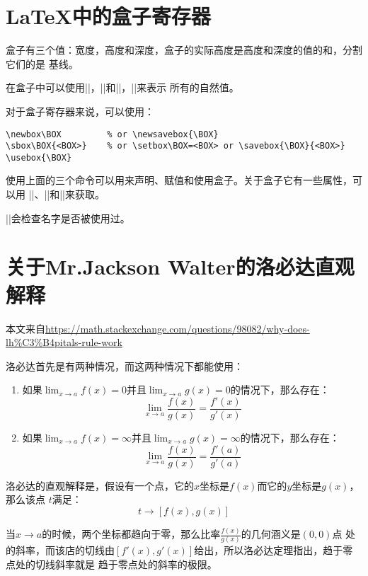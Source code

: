 
\section{\LaTeX{}中的盒子寄存器}

盒子有三个值：宽度，高度和深度，盒子的实际高度是高度和深度的值的和，分割它们的是
基线。

在盒子中可以使用\vb|\width|，\vb|\height|和\vb|\depth|，\vb|\totalheight|来表示
所有的自然值。

对于盒子寄存器来说，可以使用：
\begin{lstlisting}
\newbox\BOX         % or \newsavebox{\BOX}
\sbox\BOX{<BOX>}    % or \setbox\BOX=<BOX> or \savebox{\BOX}{<BOX>}
\usebox{\BOX}
\end{lstlisting}

使用上面的三个命令可以用来声明、赋值和使用盒子。关于盒子它有一些属性，可以用%
\vb|\ht|、\vb|\wd|和\vb|\dp|来获取。

\vb|\newsavebox|会检查名字是否被使用过。



\section{关于Mr.Jackson Walter的洛必达直观解释}

本文来自\url{https://math.stackexchange.com/questions/98082/why-does-lh\%C3\%B4pitals-rule-work}

洛必达首先是有两种情况，而这两种情况下都能使用：

\begin{enumerate}
    \item 如果$\lim_{x\to a}f(x)=0$并且$\lim_{x\to a}g(x)=0$的情况下，那么存在：
        \[\lim_{x\to a}\frac{f(x)}{g(x)}=\frac{f'(x)}{g'(x)}\]
    \item 如果$\lim_{x\to a}f(x)=\infty$并且$\lim_{x\to a}g(x)=\infty$的情况下，那么存在：
        \[\lim_{x\to a}\frac{f(x)}{g(x)}=\frac{f'(a)}{g'(a)}\]
\end{enumerate}

洛必达的直观解释是，假设有一个点，它的$x$坐标是$f(x)$而它的$y$坐标是$g(x)$，那么该点%
$t$满足：
\[ t \to [f(x), g(x)] \]

当$x\to a$的时候，两个坐标都趋向于零，那么比率$\frac{f(x)}{g(x)}$的几何涵义是$(0, 0)$点
处的斜率，而该店的切线由$[f'(x), g'(x)]$给出，所以洛必达定理指出，趋于零点处的切线斜率就是
趋于零点处的斜率的极限。

